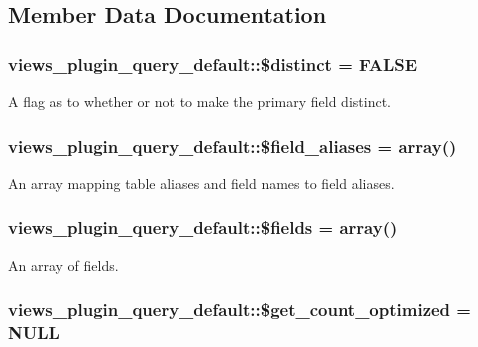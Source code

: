 \subsection{Member Data Documentation}
\hypertarget{classviews__plugin__query__default_a37f3813ca0186cc80579e617ba612b49}{
\subsubsection[{\$distinct}]{\setlength{\rightskip}{0pt plus 5cm}views\_\-plugin\_\-query\_\-default::\$distinct = FALSE}}
\label{classviews__plugin__query__default_a37f3813ca0186cc80579e617ba612b49}
A flag as to whether or not to make the primary field distinct. \hypertarget{classviews__plugin__query__default_a3e2bb7d60a731bf48eb852d963588eba}{
\subsubsection[{\$field\_\-aliases}]{\setlength{\rightskip}{0pt plus 5cm}views\_\-plugin\_\-query\_\-default::\$field\_\-aliases = array()}}
\label{classviews__plugin__query__default_a3e2bb7d60a731bf48eb852d963588eba}
An array mapping table aliases and field names to field aliases. \hypertarget{classviews__plugin__query__default_afa5f8f33e73ba1f4da8cab4024a70023}{
\subsubsection[{\$fields}]{\setlength{\rightskip}{0pt plus 5cm}views\_\-plugin\_\-query\_\-default::\$fields = array()}}
\label{classviews__plugin__query__default_afa5f8f33e73ba1f4da8cab4024a70023}
An array of fields. \hypertarget{classviews__plugin__query__default_a2744778e8e8b20a19fcbcfebd0dd1388}{
\subsubsection[{\$get\_\-count\_\-optimized}]{\setlength{\rightskip}{0pt plus 5cm}views\_\-plugin\_\-query\_\-default::\$get\_\-count\_\-optimized = NULL}}
